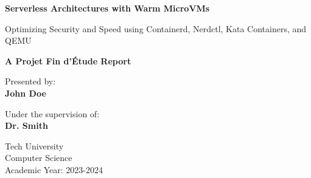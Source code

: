 \documentclass[12pt,a4paper]{report}
\begin{document}
\begin{titlepage}
    \begin{center}
        \vspace*{1cm}

        \Huge
        \textbf{Serverless Architectures with Warm MicroVMs}

        \vspace{0.5cm}
        \LARGE
        Optimizing Security and Speed using Containerd, Nerdctl, Kata Containers, and QEMU

        \vspace{1.5cm}

        \textbf{A Projet Fin d'\'Etude Report}

        \vfill

        \Large
        Presented by:\\
        \textbf{John Doe}

        \vspace{0.8cm}

        Under the supervision of:\\
        \textbf{Dr. Smith}

        \vspace{1.5cm}

        \Large
        Tech University\\
        Computer Science\\
        Academic Year: 2023-2024

    \end{center}
\end{titlepage}

\begin{abstract}
The rise of serverless computing has transformed modern software architecture, offering abstract infrastructure and pay-as-you-go pricing. However, standard container-based architectures face a critical challenge: cold starts, which degrade performance, and container escapes, which compromise security. Virtual Machines (VMs) provide stronger isolation but suffer from slow initialization times. This project addresses these issues by proposing a novel serverless service leveraging containerd, nerdctl, Kata Containers, and QEMU. To achieve both speed and security, similar to AWS Firecracker, we implement a "warm up" strategy where microVMs are pre-provisioned, kept in a paused state, and then unpaused for function invocations. This approach eliminates cold starts while maintaining the robust security isolation of hardware virtualization. This report details the architecture, implementation, and provides a comparative benchmark against AWS Firecracker, demonstrating the viability of paused Kata containers for high-performance serverless workloads.
\end{abstract}

\tableofcontents
\listoffigures
\listoftables









\end{document}
